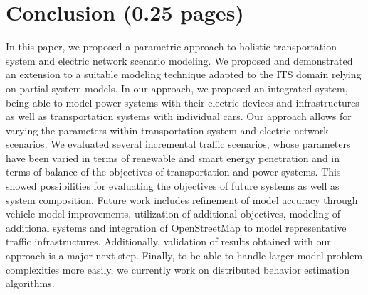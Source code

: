 \section{Conclusion (0.25 pages)}
\label{section:conclusion}

In this paper, we proposed a parametric approach to holistic transportation system and electric network scenario modeling. We proposed and demonstrated an extension to a suitable modeling technique adapted to the ITS domain relying on partial system models. 
In our approach, we proposed an integrated system, being able to model power systems with their electric devices and infrastructures as well as transportation systems with individual cars. Our approach allows for varying the parameters within transportation system and electric network scenarios. We evaluated several incremental traffic scenarios, whose parameters have been varied in terms of renewable and smart energy penetration and in terms of balance of the objectives of transportation and power systems. 
This showed possibilities for evaluating the objectives of future systems as well as system composition. Future work includes refinement of model accuracy through vehicle model improvements, utilization of additional objectives, modeling of additional systems and integration of OpenStreetMap to model representative traffic infrastructures. Additionally, validation of results obtained with our approach is a major next step. Finally, to be able to handle larger model problem complexities more easily, we currently work on distributed behavior estimation algorithms.

